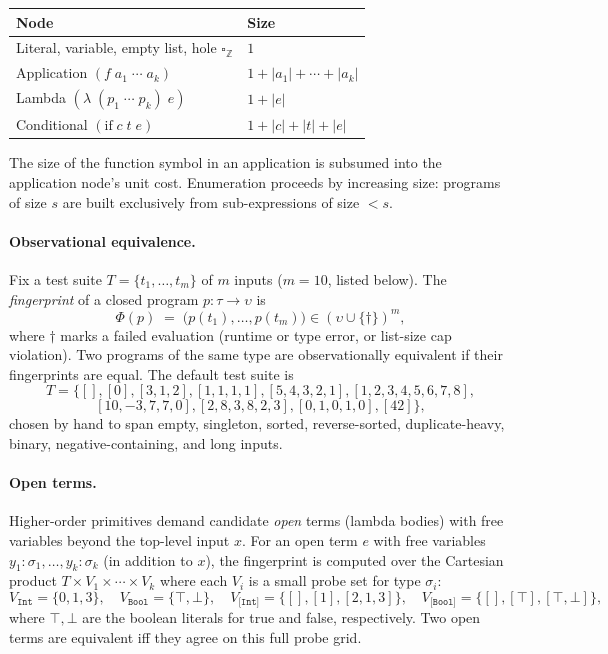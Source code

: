 \documentclass[12pt]{article}
\begin{document}
\begin{center}
\begin{tabular}{ll}
\toprule
Node & Size \\
\midrule
Literal, variable, empty list, hole $\square_{\mathbb{Z}}$ & $1$ \\
Application $(f\;a_1\;\cdots\;a_k)$ & $1 + |a_1| + \cdots + |a_k|$ \\
Lambda $(\lambda\;(p_1\;\cdots\;p_k)\;e)$ & $1 + |e|$ \\
Conditional $(\mathrm{if}\;c\;t\;e)$ & $1 + |c| + |t| + |e|$ \\
\bottomrule
\end{tabular}
\end{center}

The size of the function symbol in an application is subsumed into the application node's unit cost. Enumeration proceeds by increasing size: programs of size $s$ are built exclusively from sub-expressions of size $<s$.

\paragraph{Observational equivalence.} Fix a test suite $T = \{t_1, \ldots, t_m\}$ of $m$ inputs ($m = 10$, listed below). The \emph{fingerprint} of a closed program $p:\tau \to \upsilon$ is
\[
  \Phi(p) \;=\; \bigl(p(t_1), \ldots, p(t_m)\bigr) \in (\upsilon \cup \{\dagger\})^m,
\]
where $\dagger$ marks a failed evaluation (runtime or type error, or list-size cap violation). Two programs of the same type are observationally equivalent if their fingerprints are equal. The default test suite is
\[
  T = \{[], [0], [3,1,2], [1,1,1,1], [5,4,3,2,1], [1,2,3,4,5,6,7,8],
\]
\[
  [10,-3,7,7,0], [2,8,3,8,2,3], [0,1,0,1,0], [42]\},
\]
chosen by hand to span empty, singleton, sorted, reverse-sorted, duplicate-heavy, binary, negative-containing, and long inputs.

\paragraph{Open terms.} Higher-order primitives demand candidate \emph{open} terms (lambda bodies) with free variables beyond the top-level input $x$. For an open term $e$ with free variables $y_1: \sigma_1, \ldots, y_k: \sigma_k$ (in addition to $x$), the fingerprint is computed over the Cartesian product $T \times V_1 \times \cdots \times V_k$ where each $V_i$ is a small probe set for type $\sigma_i$:
\[
  V_{\texttt{Int}} = \{0,1,3\}, \quad V_{\texttt{Bool}} = \{\top,\bot\}, \quad V_{\texttt{[Int]}} = \{[], [1], [2,1,3]\}, \quad V_{\texttt{[Bool]}} = \{[], [\top], [\top,\bot]\},
\]
where $\top, \bot$ are the boolean literals for true and false, respectively.
Two open terms are equivalent iff they agree on this full probe grid.
\end{document}

